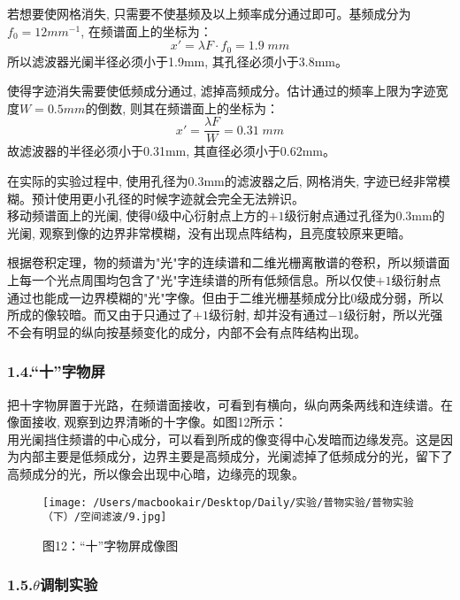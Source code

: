 \documentclass[23pt,a4paper,two column]{article}
\begin{document}
若想要使网格消失, 只需要不使基频及以上频率成分通过即可。基频成分为$f_0=12mm^{-1}$, 在频谱面上的坐标为：
\begin{equation*}
x' = \lambda F \cdot f_0=1.9\;mm
\end{equation*}
所以滤波器光阑半径必须小于1.9mm, 其孔径必须小于3.8mm。

使得字迹消失需要使低频成分通过, 滤掉高频成分。估计通过的频率上限为字迹宽度$W=0.5mm$的倒数, 则其在频谱面上的坐标为：
\begin{equation*}
x' = \frac{\lambda F}{W}=0.31\;mm
\end{equation*}
故滤波器的半径必须小于0.31mm, 其直径必须小于0.62mm。
	
在实际的实验过程中, 使用孔径为0.3mm的滤波器之后, 网格消失, 字迹已经非常模糊。预计使用更小孔径的时候字迹就会完全无法辨识。\\

移动频谱面上的光阑, 使得0级中心衍射点上方的$+1$级衍射点通过孔径为0.3mm的光阑, 观察到像的边界非常模糊，没有出现点阵结构，且亮度较原来更暗。

根据卷积定理，物的频谱为"光"字的连续谱和二维光栅离散谱的卷积，所以频谱面上每一个光点周围均包含了"光"字连续谱的所有低频信息。所以仅使$+1$级衍射点通过也能成一边界模糊的"光"字像。但由于二维光栅基频成分比0级成分弱，所以所成的像较暗。而又由于只通过了$+1$级衍射, 却并没有通过$-1$级衍射，所以光强不会有明显的纵向按基频变化的成分，内部不会有点阵结构出现。
	
\subsubsection*{1.4.“十”字物屏}

把十字物屏置于光路，在频谱面接收，可看到有横向，纵向两条两线和连续谱。在像面接收, 观察到边界清晰的十字像。如图12所示：\\
	
用光阑挡住频谱的中心成分，可以看到所成的像变得中心发暗而边缘发亮。这是因为内部主要是低频成分，边界主要是高频成分，光阑滤掉了低频成分的光，留下了高频成分的光，所以像会出现中心暗，边缘亮的现象。

\begin{figure}[H]
\centering
\texttt{[image: /Users/macbookair/Desktop/Daily/实验/普物实验/普物实验（下）/空间滤波/9.jpg]}
\caption*{图12：“十”字物屏成像图}
\end{figure}
	
\subsubsection*{1.5.$\theta$调制实验}
\end{document}
